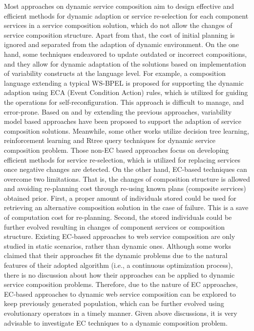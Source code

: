 Most approaches on dynamic service composition aim to design effective and efficient methods for dynamic adaption or service re-selection for each component services in a service composition solution, which do not allow the changes of service composition structure. Apart from that, the cost of initial planning is ignored and separated from the adaption of dynamic environment. On the one hand, some techniques \cite{andrews2003business,baresi2011self,koning2009vxbpel} endeavored to update outdated or incorrect compositions, and they allow for dynamic adaptation of the solutions based on implementation of variability constructs at the language level. For example, a composition language extending a typical WS-BPEL \cite{andrews2003business} is proposed for supporting the dynamic adaption using ECA (Event Condition Action) rules, which is utilized for guiding the operations for self-reconfiguration. This approach is difficult to manage, and error-prone. Based on and by extending the previous approaches, variability model based approaches \cite{alferez2014dynamic} have been proposed to support the adaption of service composition solutions. Meanwhile, some other works \cite{mohanty2010web,salas2006ws,wagner2016robust,yin2010qos} utilize decision tree learning, reinforcement learning and Rtree query techniques for dynamic service composition problem. Those non-EC based approaches focus on developing efficient methods for service re-selection, which is utilized for replacing services once negative changes are detected. On the other hand, EC-based techniques can overcome two limitations. That is, the changes of composition structure is allowed and avoiding re-planning cost through re-using known plans (composite services) obtained prior. First, a proper amount of individuals stored could be used for retrieving an alternative composition solution in the case of failure. This is a save of computation cost for re-planning. Second, the stored individuals could be further evolved resulting in changes of component services or composition structure. Existing EC-based approaches to web service composition are only studied in static scenarios, rather than dynamic ones. Although some works \cite{feng2013dynamic,liu2005dynamic} claimed that their approaches fit the dynamic problems due to the natural features of their adopted algorithm (i.e., a continuous optimization process), there is no discussion about how their approaches can be applied to dynamic service composition problems. Therefore, due to the nature of EC approaches, EC-based approaches to dynamic web service composition can be explored to keep previously generated population, which can be further evolved using evolutionary operators in a timely manner. Given above discussions, it is very advisable to investigate EC techniques to a dynamic composition problem.


